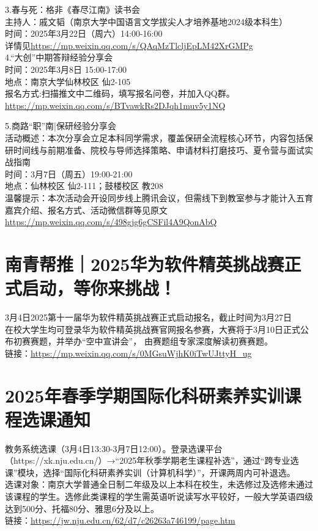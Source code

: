 \documentclass[letterpaper, 12pt]{article}
\begin{document}
\begin{multicols}{2}
3.春与死：格非《春尽江南》读书会\\
主持人：戚文韬（南京大学中国语言文学拔尖人才培养基地2024级本科生）\\
时间：2025年3月22日（周六）14:00-16:00\\
详情见\url{https://mp.weixin.qq.com/s/QAqMzTlcljEpLM42XrGMPg}\\

4.“大创”中期答辩经验分享会\\
时间：2025年3月8日 15:00-17:00\\
地点：南京大学仙林校区 仙2-105\\
报名方式:扫描推文中二维码，填写报名问卷，并加入QQ群。\\
\url{https://mp.weixin.qq.com/s/BTvawkRs2DJqh1muv5y1NQ}

5.商路“职”南|保研经验分享会\\
活动概述：本次分享会立足本科同学需求，覆盖保研全流程核心环节，内容包括保研时间线与前期准备、院校与导师选择策略、申请材料打磨技巧、夏令营与面试实战指南\\
时间：3月7日（周五）19:00-21:00\\
地点：仙林校区 仙2-111；鼓楼校区 教208\\
温馨提示：本次活动会开设同步线上腾讯会议，但需线下到教室参与才能计入五育\\
嘉宾介绍、报名方式、活动微信群等见原文\url{https://mp.weixin.qq.com/s/498gjg6gCSFil4A9QonAbQ}\\


\section{南青帮推｜2025华为软件精英挑战赛正式启动，等你来挑战！}
3月4日2025第十一届华为软件精英挑战赛正式启动报名，截止时间为3月27日\\
在校大学生均可登录华为软件精英挑战赛官网报名参赛，大赛将于3月10日正式公布初赛赛题，并举办“空中宣讲会”， 由赛题组专家深度解读初赛赛题。\\
链接：\url{https://mp.weixin.qq.com/s/0MGsuWjhK0iTwUJttyH_ug}\\

\section{2025年春季学期国际化科研素养实训课程选课通知}
教务系统选课（3月4日13:30-3月7日12:00）。登录选课平台（https://xk.nju.edu.cn/）→“2025年秋季学期老生课程补选”，通过“跨专业选课”模块，选择“国际化科研素养实训（计算机科学）”，开课两周内可补退选。\\
选课对象：南京大学普通全日制二年级及以上本科在校生，未选修过及选修未通过该课程的学生。选修此类课程的学生需英语听说读写水平较好，一般大学英语四级达到500分、托福80分、雅思6分及以上。\\
链接：\url{https://jw.nju.edu.cn/62/d7/c26263a746199/page.htm}\\

\end{multicols}
\end{document}
